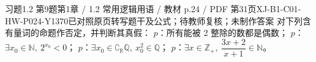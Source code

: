 \par\noindent\begin{minipage}{\linewidth}
\begin{bankitem}{习题1.2 第9题}{第1章 / 1.2 常用逻辑用语 / 教材 p.24 / PDF 第31页}{XJ-B1-C01-HW-P024-Y1370}{已对照原页转写题干及公式；待教师复核；未制作答案}
对下列含有量词的命题作否定，并判断其真假：
$p$：所有能被 2 整除的数都是偶数；
$p$：$\exists x_0\in\mathbb N,\ 2^{x_0}<0$；
$p$：$\exists x_0\in\complement_{\mathbb R}\mathbb Q,\ x_0^2\in\mathbb Q$；
$p$：$\exists x\in\mathbb Z_+,\ \dfrac{3x+2}{x+1}\in\mathbb N$。
\end{bankitem}
\end{minipage}\par\medskip
